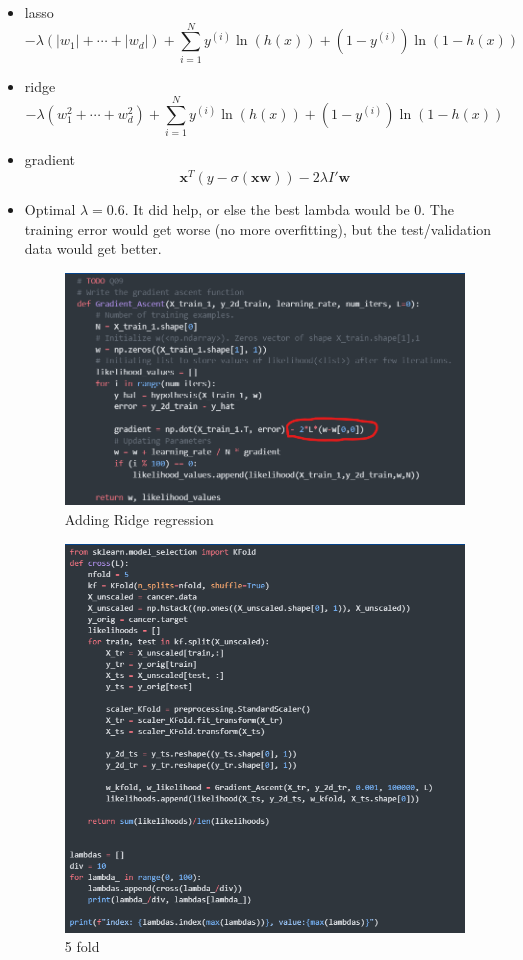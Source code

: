 \documentclass[12pt]{article}
\begin{document}
\begin{itemize}
	\item lasso \[ -\lambda\left(|w_1| + \cdots + |w_d|\right) + \sum\limits_{i=1}^{N} y^{(i)} \ln{(h(x))} + (1-y^{(i)})\ln{(1-h(x))} \]
	
	\item ridge \[ -\lambda\left(w_1^2 + \cdots + w_d^2\right) + \sum\limits_{i=1}^{N} y^{(i)} \ln{(h(x))} + (1-y^{(i)})\ln{(1-h(x))} \]
	
	\item gradient \[\textbf{x}^T(y-\sigma{(\textbf{x}\mathbf{w})}) - 2 \lambda I' \mathbf{w}\]
	
	\item Optimal $ \lambda = 0.6 $. It did help, or else the best lambda would be 0. The training error would get worse (no more overfitting), but the test/validation data would get better.
	\begin{figure}[H]
		\centering
		\includegraphics{images/ridgereg.png}
		\caption{Adding Ridge regression}
		\label{fig:4:ridgereg}
	\end{figure}
	
	\begin{figure}[H]
		\centering
		\includegraphics[width=\textwidth]{images/kfold.png}
		\caption{5 fold}
		\label{fig:4:kfold}
	\end{figure}	
\end{itemize}
\end{document}
